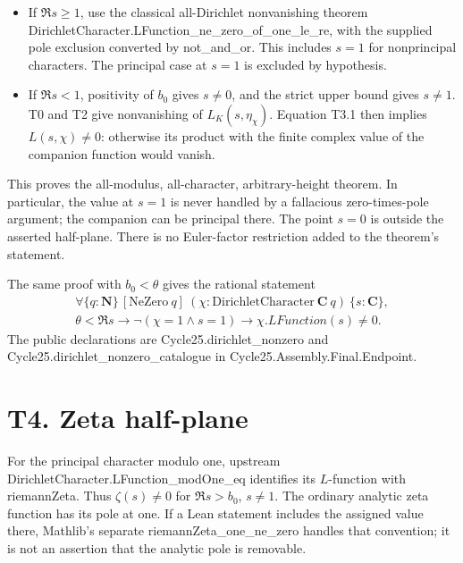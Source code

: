 \documentclass[11pt,a4paper]{article}
\newcommand{\sourcecode}[1]{{\small\ttfamily #1}}
\providecommand{\tightlist}{\setlength{\itemsep}{0pt}\setlength{\parskip}{0pt}}
\begin{document}
\begin{itemize}
\tightlist
\item
  If \(\Re s\ge1\), use the classical all-Dirichlet nonvanishing theorem
  \sourcecode{Dirichlet\allowbreak{}Character.\allowbreak{}LFunction\_\allowbreak{}ne\_\allowbreak{}zero\_\allowbreak{}of\_\allowbreak{}one\_\allowbreak{}le\_\allowbreak{}re}, with
  the supplied pole exclusion converted by \sourcecode{not\_\allowbreak{}and\_\allowbreak{}or}. This
  includes \(s=1\) for nonprincipal characters. The principal case at
  \(s=1\) is excluded by hypothesis.
\item
  If \(\Re s<1\), positivity of \(b_0\) gives \(s\ne0\), and the strict
  upper bound gives \(s\ne1\). T0 and T2 give nonvanishing of
  \(L_K(s,\allowbreak{}\eta_\chi)\). Equation T3.1 then implies \(L(s,\allowbreak{}\chi)\ne0\):
  otherwise its product with the finite complex value of the companion
  function would vanish.
\end{itemize}

This proves the all-modulus, all-character, arbitrary-height theorem. In
particular, the value at \(s=1\) is never handled by a fallacious
zero-times-pole argument; the companion can be principal there. The
point \(s=0\) is outside the asserted half-plane. There is no
Euler-factor restriction added to the theorem's statement.

The same proof with \(b_0<\theta\) gives the rational statement \[
\begin{gathered}
\forall\{q:\mathbf N\}\,[\mathrm{NeZero}\ q]\ (\chi:\mathrm{DirichletCharacter}\ \mathbf C\ q)
\ \{s:\mathbf C\},\\
\theta<\Re s\to\neg(\chi=1\land s=1)\to\chi.LFunction(s)\ne0.
\end{gathered}
\] The public declarations are \sourcecode{Cycle25.\allowbreak{}dirichlet\_\allowbreak{}nonzero} and
\sourcecode{Cycle25.\allowbreak{}dirichlet\_\allowbreak{}nonzero\_\allowbreak{}catalogue} in
\sourcecode{Cycle25.\allowbreak{}Assembly.\allowbreak{}Final.\allowbreak{}Endpoint}.

\hypertarget{t4.-zeta-half-plane}{%
\section{T4. Zeta half-plane}\label{t4.-zeta-half-plane}}

For the principal character modulo one, upstream
\sourcecode{Dirichlet\allowbreak{}Character.\allowbreak{}LFunction\_\allowbreak{}mod\allowbreak{}One\_\allowbreak{}eq} identifies its
\(L\)-function with \sourcecode{riemann\allowbreak{}Zeta}. Thus \(\zeta(s)\ne0\) for
\(\Re s>b_0\), \(s\ne1\). The ordinary analytic zeta function has its
pole at one. If a Lean statement includes the assigned value there,
Mathlib's separate \sourcecode{riemann\allowbreak{}Zeta\_\allowbreak{}one\_\allowbreak{}ne\_\allowbreak{}zero} handles that
convention; it is not an assertion that the analytic pole is removable.
\end{document}
